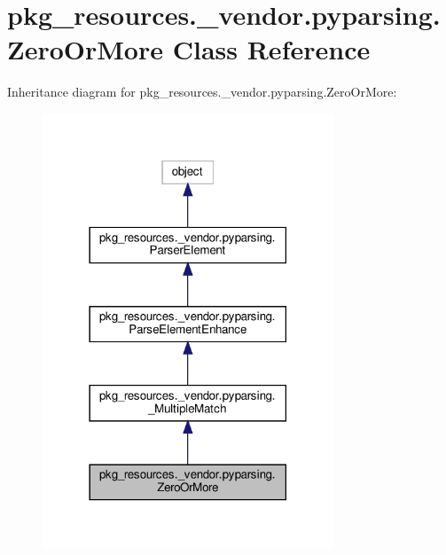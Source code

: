 \hypertarget{classpkg__resources_1_1__vendor_1_1pyparsing_1_1ZeroOrMore}{}\section{pkg\+\_\+resources.\+\_\+vendor.\+pyparsing.\+Zero\+Or\+More Class Reference}
\label{classpkg__resources_1_1__vendor_1_1pyparsing_1_1ZeroOrMore}


Inheritance diagram for pkg\+\_\+resources.\+\_\+vendor.\+pyparsing.\+Zero\+Or\+More\+:
\nopagebreak
\begin{figure}[H]
\begin{center}
\leavevmode
\includegraphics[width=246pt]{classpkg__resources_1_1__vendor_1_1pyparsing_1_1ZeroOrMore__inherit__graph}
\end{center}
\end{figure}


